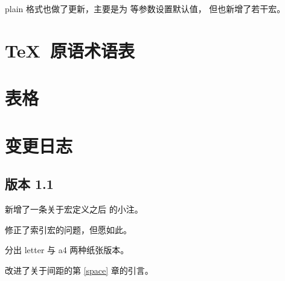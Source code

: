 \documentclass[a4paper]{rapport3}
\def\alt{}\def\altt{}%
\begin{document}
plain 格式也做了更新，主要是为  等参数设置默认值，\alt
但也新增了若干宏。

\endofchapter

\chapter{\TeX\ 原语术语表}
\begin{raggedright}

\end{raggedright}
\endofchapter

\chapter{表格}\label{table}
\pagestyle{plain}
\clearpage

\endofchapter


\printindex

\mdqon


\mdqoff
\endofchapter


\chapter*{变更日志}

\section*{版本 1.1}

新增了一条关于宏定义之后  的小注。

修正了索引宏的问题，但愿如此。

分出 letter 与 a4 两种纸张版本。

改进了关于间距的第 \ref{space} 章的引言。
\end{document}
